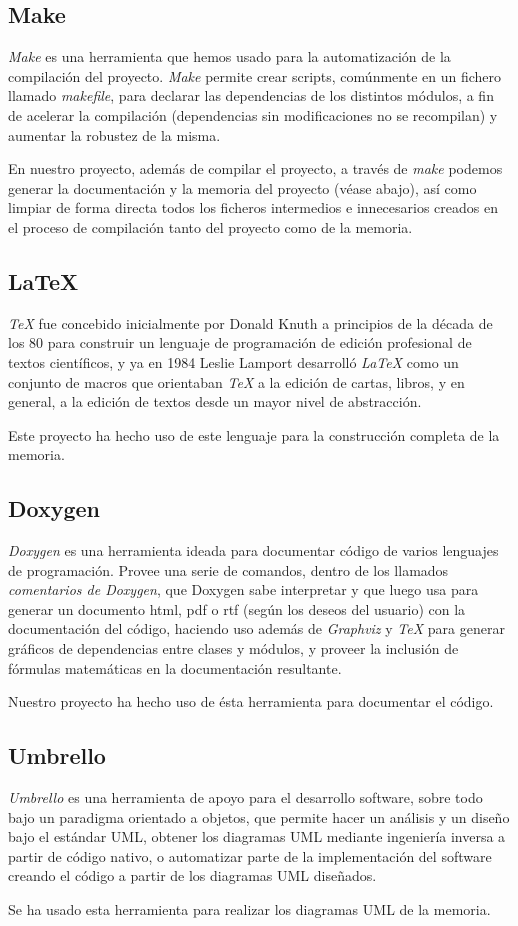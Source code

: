 \subsection{Make}
\emph{Make} es una herramienta que hemos usado para la automatización
de la compilación del proyecto. \emph{Make} permite crear scripts,
comúnmente en un fichero llamado \emph{makefile}, para declarar las
dependencias de los distintos módulos, a fin de acelerar la
compilación (dependencias sin modificaciones no se recompilan) y
aumentar la robustez de la misma.

En nuestro proyecto, además de compilar el proyecto, a través de
\emph{make} podemos generar la documentación y la memoria del proyecto
(véase abajo), así como limpiar de forma directa todos los ficheros
intermedios e innecesarios creados en el proceso de compilación tanto
del proyecto como de la memoria.

\subsection{LaTeX}
\emph{TeX} fue concebido inicialmente por Donald Knuth a principios de la década de los
80 para construir un lenguaje de programación de edición
profesional de textos científicos, y ya en 1984 Leslie Lamport
desarrolló \emph{LaTeX} como un conjunto de macros que orientaban \emph{TeX}
a la edición de cartas, libros, y en general, a la edición de textos
desde un mayor nivel de abstracción.

Este proyecto ha hecho uso de este lenguaje para la construcción completa
de la memoria.

\subsection{Doxygen}
\emph{Doxygen} es una herramienta ideada para documentar código de
varios lenguajes de programación. Provee una serie de comandos, dentro
de los llamados \emph{comentarios de Doxygen}, que Doxygen sabe
interpretar y que luego usa para generar un documento html, pdf o rtf
(según los deseos del usuario) con la documentación del código,
haciendo uso además de \emph{Graphviz} y \emph{TeX} para generar gráficos de
dependencias entre clases y módulos, y proveer la inclusión de
fórmulas matemáticas en la documentación resultante.

Nuestro proyecto ha hecho uso de ésta herramienta para documentar el
código.

\subsection{Umbrello}
\emph{Umbrello} es una herramienta de apoyo para el desarrollo
software, sobre todo bajo un paradigma orientado a objetos, que
permite hacer un análisis y un diseño bajo el estándar UML, obtener
los diagramas UML mediante ingeniería inversa a partir de código
nativo, o automatizar parte de la implementación del software
creando el código a partir de los diagramas UML diseñados.

Se ha usado esta herramienta para realizar los diagramas UML de la
memoria.